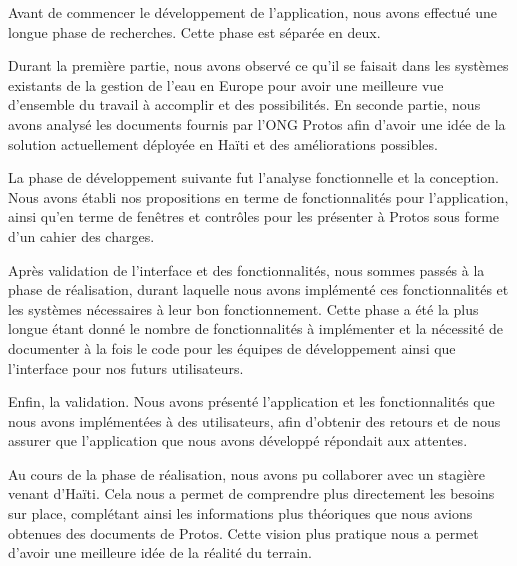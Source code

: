 \documentclass{EPL-master-thesis-covers-FR}
\begin{document}
			Avant de commencer le développement de l'application, nous avons effectué une longue phase de recherches. Cette phase est séparée en deux.

			Durant la première partie, nous avons observé ce qu'il se faisait dans les systèmes existants de la gestion de l'eau en Europe pour avoir une meilleure vue d'ensemble du travail à accomplir et des possibilités. En seconde partie, nous avons analysé les documents fournis par l'ONG Protos afin d'avoir une idée de la solution actuellement déployée en Haïti et des améliorations possibles.

			La phase de développement suivante fut l'analyse fonctionnelle et la conception. Nous avons établi nos propositions en terme de fonctionnalités pour l'application, ainsi qu'en terme de fenêtres et contrôles pour les présenter à Protos sous forme d'un cahier des charges.

			Après validation de l'interface et des fonctionnalités, nous sommes passés à la phase de réalisation, durant laquelle nous avons implémenté ces fonctionnalités et les systèmes nécessaires à leur bon fonctionnement. Cette phase a été la plus longue étant donné le nombre de fonctionnalités à implémenter et la nécessité de documenter à la fois le code pour les équipes de développement ainsi que l'interface pour nos futurs utilisateurs.

			Enfin, la validation. Nous avons présenté l'application et les fonctionnalités que nous avons implémentées à des utilisateurs, afin d'obtenir des retours et de nous assurer que l'application que nous avons développé répondait aux attentes. %

			Au cours de la phase de réalisation, nous avons pu collaborer avec un stagière venant d'Haïti. Cela nous a permet de comprendre plus directement les besoins sur place, complétant ainsi les informations plus théoriques que nous avions obtenues des documents de Protos. Cette vision plus pratique nous a permet d'avoir une meilleure idée de la réalité du terrain.
\end{document}
